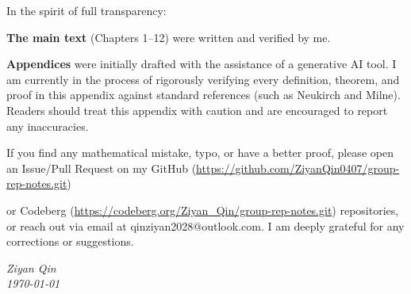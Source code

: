 \vspace{1em}
In the spirit of full transparency: 

\noindent
\textbf{The main text} (Chapters 1--12) were written and verified by me.

\noindent
\textbf{Appendices} were initially drafted with the assistance of a generative AI tool. I am currently in the process of rigorously verifying every definition, theorem, and proof in this appendix against standard references (such as Neukirch and Milne). Readers should treat this appendix with caution and are encouraged to report any inaccuracies.

\vspace{1em}
If you find any mathematical mistake, typo, or have a better proof, please open an Issue/Pull Request on my GitHub (\url{https://github.com/ZiyanQin0407/group-rep-notes.git})

\noindent
or Codeberg (\url{https://codeberg.org/Ziyan_Qin/group-rep-notes.git}) repositories, or reach out via email at qinziyan2028@outlook.com. I am deeply grateful for any corrections or suggestions.

\vspace{2em}
\begin{flushright}
    \textit{Ziyan Qin} \\
    \textit{\today}
\end{flushright}
